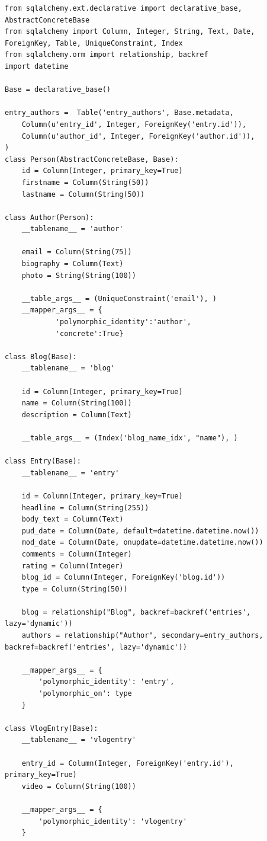 \documentclass[ing,male,java,dept456]{diploma}						%
\begin{document}
\begin{lstlisting}[style=custompython, label=src:sqla-mapping, caption={Schéma jednoduché aplikace pro vytváření blogů v SQLAlchemy}]
from sqlalchemy.ext.declarative import declarative_base, AbstractConcreteBase
from sqlalchemy import Column, Integer, String, Text, Date, ForeignKey, Table, UniqueConstraint, Index
from sqlalchemy.orm import relationship, backref
import datetime

Base = declarative_base()

entry_authors =  Table('entry_authors', Base.metadata,
    Column(u'entry_id', Integer, ForeignKey('entry.id')),
    Column(u'author_id', Integer, ForeignKey('author.id')),
)
class Person(AbstractConcreteBase, Base):
    id = Column(Integer, primary_key=True)
    firstname = Column(String(50))
    lastname = Column(String(50))

class Author(Person):
    __tablename__ = 'author'

    email = Column(String(75))
    biography = Column(Text)
    photo = String(String(100))

    __table_args__ = (UniqueConstraint('email'), )
    __mapper_args__ = {
			'polymorphic_identity':'author',
			'concrete':True}

class Blog(Base):
    __tablename__ = 'blog'

    id = Column(Integer, primary_key=True)
    name = Column(String(100))
    description = Column(Text)

    __table_args__ = (Index('blog_name_idx', "name"), )

class Entry(Base):
    __tablename__ = 'entry'

    id = Column(Integer, primary_key=True)
    headline = Column(String(255))
    body_text = Column(Text)
    pud_date = Column(Date, default=datetime.datetime.now())
    mod_date = Column(Date, onupdate=datetime.datetime.now())
    comments = Column(Integer)
    rating = Column(Integer)
    blog_id = Column(Integer, ForeignKey('blog.id'))
    type = Column(String(50))

    blog = relationship("Blog", backref=backref('entries', lazy='dynamic'))
    authors = relationship("Author", secondary=entry_authors, backref=backref('entries', lazy='dynamic'))

    __mapper_args__ = {
        'polymorphic_identity': 'entry',
        'polymorphic_on': type
    }

class VlogEntry(Base):
    __tablename__ = 'vlogentry'

    entry_id = Column(Integer, ForeignKey('entry.id'), primary_key=True)
    video = Column(String(100))

    __mapper_args__ = {
        'polymorphic_identity': 'vlogentry'
    }
\end{lstlisting}
\end{document}
